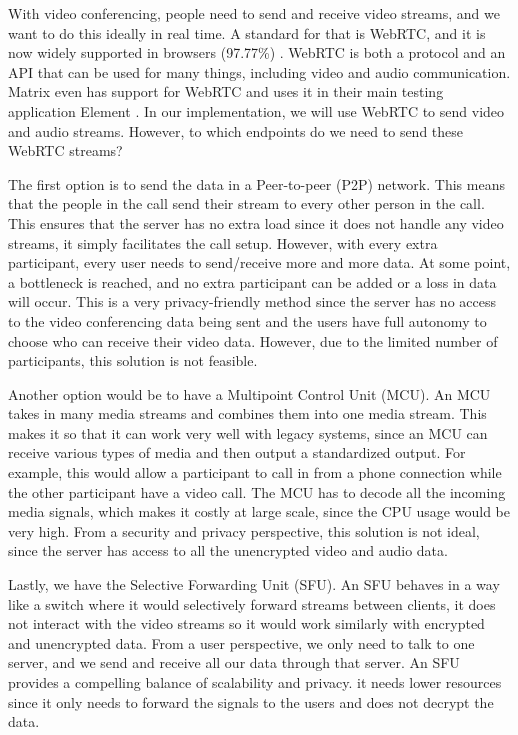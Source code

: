 \documentclass{report}
\begin{document}
    With video conferencing, people need to send and receive video streams, and we want to do this ideally in real time.
    A standard for that is WebRTC, and it is now widely supported in browsers (97.77\%) \cite{CIUIWEBRTC}
    . WebRTC is both a protocol and an API that can be used for many things, including video and audio communication.
    Matrix even has support for WebRTC and uses it in their main testing application Element \cite{ELEMENT}
    . In our implementation, we will use WebRTC to send video and audio streams. However, to which endpoints do we need
    to send these WebRTC streams?

    The first option is to send the data in a Peer-to-peer (P2P) network. This means that the people in the call send
    their stream to every other person in the call. This ensures that the server has no extra load since it does not
    handle any video streams, it simply facilitates the call setup. However, with every extra participant, every user
    needs to send/receive more and more data. At some point, a bottleneck is reached, and no extra participant can be
    added or a loss in data will occur. This is a very privacy-friendly method since the server has no access to the
    video conferencing data being sent and the users have full autonomy to choose who can receive their video data.
    However, due to the limited number of participants, this solution is not feasible.

    Another option would be to have a Multipoint Control Unit (MCU). An MCU takes in many media streams and combines
    them into one media stream. This makes it so that it can work very well with legacy systems, since an MCU can
    receive various types of media and then output a standardized output. For example, this would allow a participant to
    call in from a phone connection while the other participant have a video call. The MCU has to decode all the
    incoming media signals, which makes it costly at large scale, since the CPU usage would be very high. From a
    security and privacy perspective, this solution is not ideal, since the server has access to all the unencrypted
    video and audio data.

    Lastly, we have the Selective Forwarding Unit (SFU). An SFU behaves in a way like a switch where it would
    selectively forward streams between clients, it does not interact with the video streams so it would work similarly
    with encrypted and unencrypted data. From a user perspective, we only need to talk to one server, and we send and
    receive all our data through that server. An SFU provides a compelling balance of scalability and privacy. it needs
    lower resources since it only needs to forward the signals to the users and does not decrypt the data.
\end{document}
